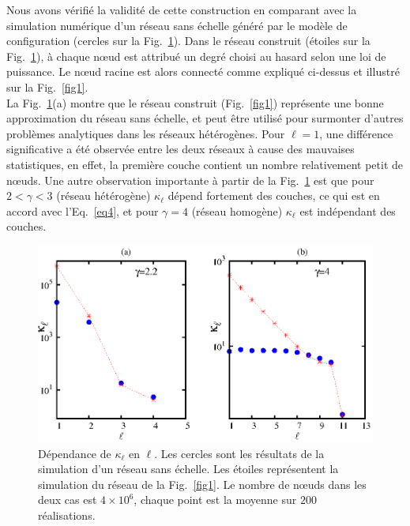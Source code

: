 Nous avons vérifié la validité de cette construction en comparant avec la simulation numérique d'un réseau sans échelle généré  par le modèle de configuration (cercles sur la Fig.~\ref{verefication-kappa}). Dans le réseau construit (étoiles sur la Fig.~\ref{verefication-kappa}), à chaque nœud est attribué un degré choisi au hasard selon  une loi de puissance. Le nœud racine  est alors connecté comme expliqué ci-dessus et illustré sur la Fig.~\ref{fig1}.\\
La Fig.~\ref{verefication-kappa}(a) montre que le réseau construit (Fig.~\ref{fig1}) représente une bonne approximation du réseau sans échelle, et peut être utilisé pour surmonter d'autres problèmes analytiques dans les réseaux hétérogènes. Pour $\ell=1$, une différence significative a été observée entre les deux réseaux à cause des mauvaises statistiques, en effet, la première couche contient un nombre relativement petit de nœuds. Une autre observation importante à partir de la Fig.~\ref{verefication-kappa} est que pour $2<\gamma<3$ (réseau hétérogène) $\kappa_{\ell}$ dépend fortement des couches, ce qui est en accord avec l'Eq.~\eqref{eq4}, et pour $\gamma=4$ (réseau homogène) $\kappa_{\ell}$ est indépendant des couches.
\begin{figure}[h!]
	\centering
	\includegraphics[scale=1,angle=0]{./figures/fig1_1kk}
	\caption{Dépendance de $\kappa_{\ell}$ en $\ell$. Les cercles sont les résultats de la  simulation d'un réseau sans échelle. Les étoiles représentent la simulation du réseau  de la Fig.~\ref{fig1}. Le nombre de nœuds dans les deux cas est $4\times10^6$, chaque point est la moyenne sur $200$ réalisations.}	
	\label{verefication-kappa}
\end{figure}

